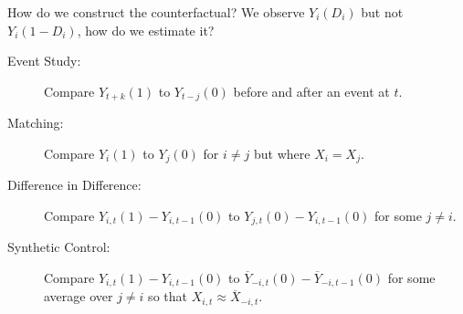 \documentclass[aspectratio=169,11pt]{beamer}
\begin{document}
\begin{frame}{How do we construct the counterfactual?}
We observe $Y_i(D_i)$ but not $Y_i(1-D_i)$, how do we estimate it?\\

\begin{description}
  \item [\alert{Event Study:}] Compare $Y_{t+k}(1)$ to $Y_{t-j}(0)$ before and after an event at $t$.
  \item [Matching:] Compare $Y_i(1)$ to $Y_j(0)$ for $i \neq j$ but where $X_i = X_j$.
  \item [Difference in Difference:] Compare $Y_{i,t}(1)-Y_{i,t-1}(0)$ to $Y_{j,t}(0)-Y_{i,t-1}(0)$  for some $j \neq i$.
  \item [Synthetic Control:] Compare $Y_{i,t}(1)-Y_{i,t-1}(0)$ to $\overline{Y}_{-i,t}(0)-\overline{Y}_{-i,t-1}(0)$ for some average over $j \neq i$ so that $X_{i,t} \approx \overline{X}_{-i,t}$.

\end{description}
\end{frame}
\end{document}
